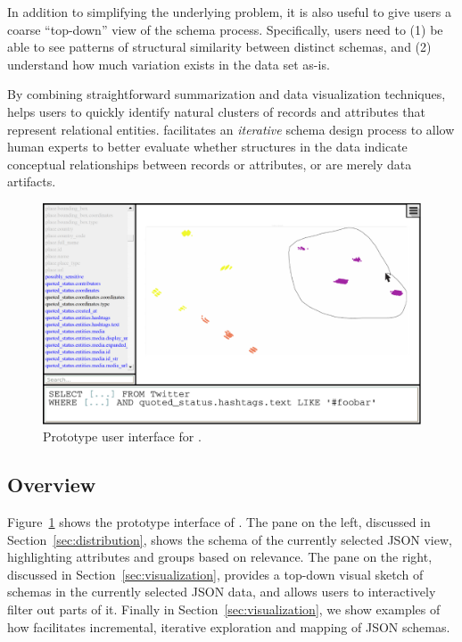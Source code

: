 In addition to simplifying the underlying problem, it is also useful to give users a coarse ``top-down'' view of the schema process.
Specifically, users need to (1) be able to see patterns of structural similarity between distinct schemas, and (2) understand how much variation exists in the data set as-is.

By combining straightforward summarization and data visualization techniques, \systemnametwo helps users to quickly identify natural clusters of records and attributes that represent relational entities.
\systemnametwo facilitates an \emph{iterative} schema design process to allow human experts to better evaluate whether structures in the data indicate conceptual relationships between records or attributes, or are merely data artifacts.

\begin{figure}
\centering
\includegraphics[width=0.9\linewidth]{SchemaSummarization/img/UI}
\caption{Prototype user interface for \systemnametwo.}
\label{fig:ui}
\end{figure}

\subsection{Overview}
Figure~\ref{fig:ui} shows the prototype interface of \systemnametwo. 
The pane on the left, discussed in Section~\ref{sec:distribution}, shows the schema of the currently selected JSON view, highlighting attributes and groups based on relevance.
The pane on the right, discussed in Section~\ref{sec:visualization}, provides a top-down visual sketch of schemas in the currently selected JSON data, and allows users to interactively filter out parts of it.
Finally in Section~\ref{sec:visualization}, we show examples of how \systemnametwo facilitates incremental, iterative exploration and mapping of JSON schemas.




